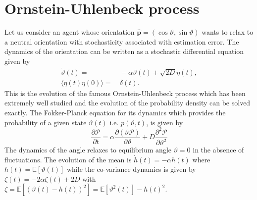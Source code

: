 \documentclass[%
reprint,
superscriptaddress,
floatfix,
amsmath,
amssymb,
aps,
notitlepage
]{revtex4-1}
\def\E{\mathbb{E}}
\def\ph{\hat{\mathbf{p}}}
\def\P{\mathcal{P}}
\def\theta{\vartheta}
\begin{document}
\section{Ornstein-Uhlenbeck process}

Let us consider an agent whose orientation $\ph = ( \cos \theta, \sin \theta)$ wants to relax to a
neutral orientation with stochasticity associated with estimation error. The dynamics of the orientation
can be written as a stochastic differential equation given by
\begin{align}
    \dot{\theta}(t) =& \ - \alpha \theta(t) + \sqrt{2 D} \eta(t), \\
    \langle \eta(t) \eta(0) \rangle =& \ \delta(t).
\end{align}
This is the evolution of the famous Ornstein-Uhlenbeck process which has been extremely well studied
and the evolution of the probability density can be solved exactly. The Fokker-Planck equation for
its dynamics which provides the probability of a given state $\theta(t)$ i.e. $p(\theta, t)$, is given by
\[
    \frac{\partial \P}{\partial t} = \alpha \frac{\partial(\theta \P)}{\partial \theta }
    + D \frac{\partial^2 \P}{\partial \theta^2}
\]
The dynamics of the angle relaxes to equilibrium angle $\theta = 0$ in the absence of fluctuations.
The evolution of the mean is $\dot{h}(t) = - \alpha h(t)$ where $h(t) = \E [ \theta(t) ]$
while the co-variance dynamics is given by $\dot{\zeta}(t) = -2\alpha \zeta(t) + 2D$ with
$\zeta = \E [  {(\theta(t) - h(t))}^2 ] = \E [  \theta^2(t) ] - h{(t)}^2$.
\end{document}

